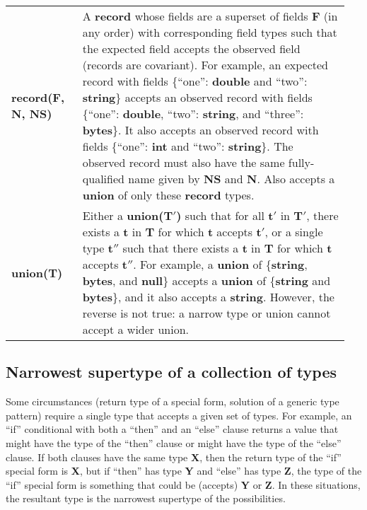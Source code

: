 \documentclass{article}
\newcommand{\PFAc}{\ttfamily\bfseries}
\newcommand{\PFAtp}{\ttfamily\bfseries}
\theoremstyle{definition}
\begin{document}
\begin{longtable}{p{0.2\linewidth} p{0.75\linewidth}}
{\bf record({\PFAtp F}, {\PFAtp N}, {\PFAtp NS})} & A {\bf record} whose fields are a superset of fields {\PFAc F} (in any order) with corresponding field types such that the expected field accepts the observed field (records are covariant).  For example, an expected record with fields \{``one'': {\bf double} and ``two'': {\bf string}\} accepts an observed record with fields \{``one'': {\bf double}, ``two'': {\bf string}, and ``three'': {\bf bytes}\}.  It also accepts an observed record with fields \{``one'': {\bf int} and ``two'': {\bf string}\}.  The observed record must also have the same fully-qualified name given by {\PFAc NS} and {\PFAc N}.  Also accepts a {\bf union} of only these {\bf record} types. \\
{\bf union({\PFAtp T})} & Either a {\bf union({\PFAtp T$'$})} such that for all {\PFAc t$'$} in {\PFAc T$'$}, there exists a {\PFAc t} in {\PFAc T} for which {\PFAc t} accepts {\PFAc t$'$}, or a single type {\PFAc t$''$} such that there exists a {\PFAc t} in {\PFAc T} for which {\PFAc t} accepts {\PFAc t$''$}.  For example, a {\bf union} of \{{\bf string}, {\bf bytes}, and {\bf null}\} accepts a {\bf union} of \{{\bf string} and {\bf bytes}\}, and it also accepts a {\bf string}.  However, the reverse is not true: a narrow type or union cannot accept a wider union.
\end{longtable}

\hypertarget{hsec:narrowest-supertype}{}
\subsection{Narrowest supertype of a collection of types}
\label{sec:narrowest-supertype}

Some circumstances (return type of a special form, solution of a generic type pattern) require a single type that accepts a given set of types.  For example, an ``if'' conditional with both a ``then'' and an ``else'' clause returns a value that might have the type of the ``then'' clause or might have the type of the ``else'' clause.  If both clauses have the same type {\PFAtp X}, then the return type of the ``if'' special form is {\PFAtp X}, but if ``then'' has type {\PFAtp Y} and ``else'' has type {\PFAtp Z}, the type of the ``if'' special form is something that could be (accepts) {\PFAtp Y} or {\PFAtp Z}.  In these situations, the resultant type is the narrowest supertype of the possibilities.
\end{document}
